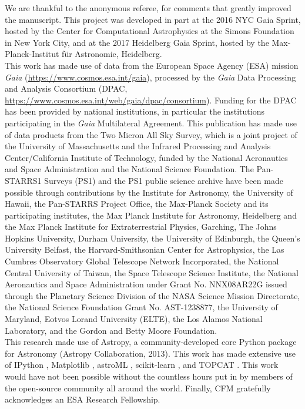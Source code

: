 \documentclass[onecolumn]{aa} %
\begin{document}
\begin{acknowledgements}
We are thankful to the anonymous referee, for comments that greatly improved the manuscript.
This project was developed in part at the 2016 NYC Gaia Sprint, hosted by the Center for Computational Astrophysics at the Simons Foundation in New York City, and at the 2017 Heidelberg Gaia Sprint, hosted by the Max-Planck-Institut für Astronomie, Heidelberg. \\
This work has made use of data from the European Space Agency (ESA)
mission {\it Gaia} (\url{https://www.cosmos.esa.int/gaia}), processed by
the {\it Gaia} Data Processing and Analysis Consortium (DPAC,
\url{https://www.cosmos.esa.int/web/gaia/dpac/consortium}). Funding
for the DPAC has been provided by national institutions, in particular
the institutions participating in the {\it Gaia} Multilateral Agreement.
This publication has made use of data products from the Two Micron All Sky Survey, which is a joint project of the University of Massachusetts and the Infrared Processing and Analysis Center/California Institute of Technology, funded by the National Aeronautics and Space Administration and the National Science Foundation. 
The Pan-STARRS1 Surveys (PS1) and the PS1 public science archive have been made possible through contributions by the Institute for Astronomy, the University of Hawaii, the Pan-STARRS Project Office, the Max-Planck Society and its participating institutes, the Max Planck Institute for Astronomy, Heidelberg and the Max Planck Institute for Extraterrestrial Physics, Garching, The Johns Hopkins University, Durham University, the University of Edinburgh, the Queen's University Belfast, the Harvard-Smithsonian Center for Astrophysics, the Las Cumbres Observatory Global Telescope Network Incorporated, the National Central University of Taiwan, the Space Telescope Science Institute, the National Aeronautics and Space Administration under Grant No. NNX08AR22G issued through the Planetary Science Division of the NASA Science Mission Directorate, the National Science Foundation Grant No. AST-1238877, the University of Maryland, Eotvos Lorand University (ELTE), the Los Alamos National Laboratory, and the Gordon and Betty Moore Foundation.
\\
This research made use of Astropy, a community-developed core Python package for Astronomy (Astropy Collaboration, 2013). This work has made extensive use of IPython \citep{ipython}, Matplotlib \citep{matplotlib}, astroML \citep{astroML}, scikit-learn \citep{scikit-learn}, and TOPCAT \citep[\url{http://www.star.bris.ac.uk/~mbt/topcat/}]{topcat}. This work would have not been possible without the countless hours put in by members of the open-source community all around the world.   
Finally, CFM gratefully acknowledges an ESA Research Fellowship.
\end{acknowledgements}
\end{document}
